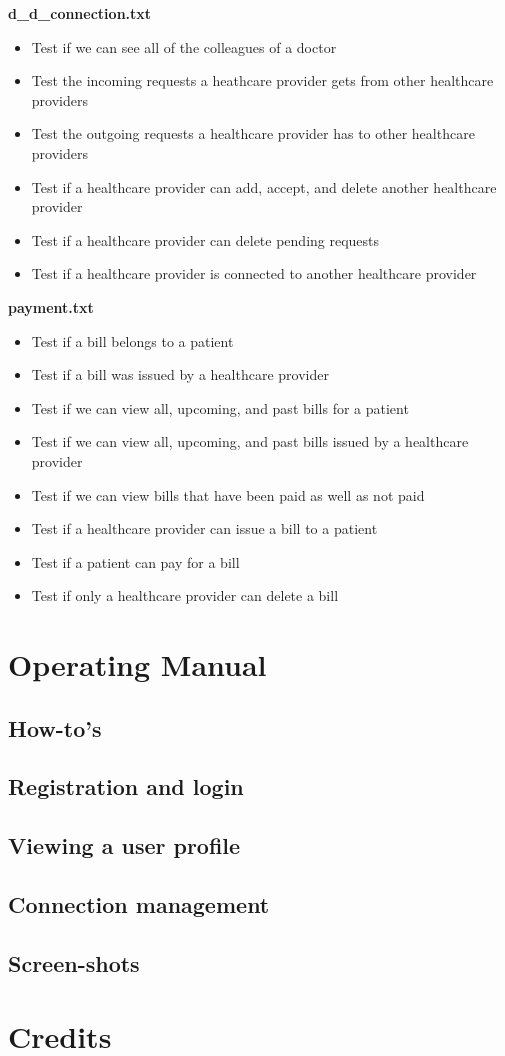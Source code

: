 \documentclass[12pt]{report}
\begin{document}
\textbf{d\_d\_connection.txt}
\begin{itemize}
\item Test if we can see all of the colleagues of a doctor
\item Test the incoming requests a heathcare provider gets from other healthcare providers
\item Test the outgoing requests a healthcare provider has to other healthcare providers
\item Test if a healthcare provider can add, accept, and delete another healthcare provider
\item Test if a healthcare provider can delete pending requests
\item Test if a healthcare provider is connected to another healthcare provider
\end{itemize}

\textbf{payment.txt}
\begin{itemize}
\item Test if a bill belongs to a patient
\item Test if a bill was issued by a healthcare provider
\item Test if we can view all, upcoming, and past bills for a patient
\item Test if we can view all, upcoming, and past bills issued by a healthcare provider
\item Test if we can view bills that have been paid as well as not paid
\item Test if a healthcare provider can issue a bill to a patient
\item Test if a patient can pay for a bill
\item Test if only a healthcare provider can delete a bill
\end{itemize}


\part{Operating Manual}
\chapter{How-to's}
\chapter{Registration and login}
\chapter{Viewing a user profile}
\chapter{Connection management}

\chapter{Screen-shots}

\part{Credits}
\end{document}
